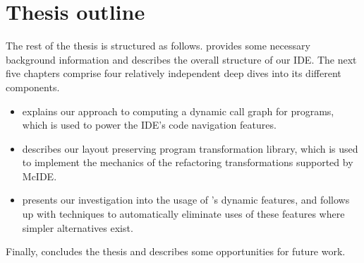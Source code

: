 \section{Thesis outline}

The rest of the thesis is structured as follows.
 provides some necessary background
information and describes the overall structure of our IDE. The next five
chapters comprise four relatively independent deep dives into its different
components.

\begin{itemize}

\item {} explains our approach to
computing a dynamic call graph for \matlab programs, which is used to power the
IDE's code navigation features.

\item {} describes our layout
preserving program transformation library, which is used to implement the
mechanics of the refactoring transformations supported by McIDE.

\item {} presents our investigation into the
usage of \matlab's dynamic features, and
 follows up with techniques to
automatically eliminate uses of these features where simpler alternatives
exist.

\end{itemize}

Finally,  concludes the thesis and describes some
opportunities for future work.
